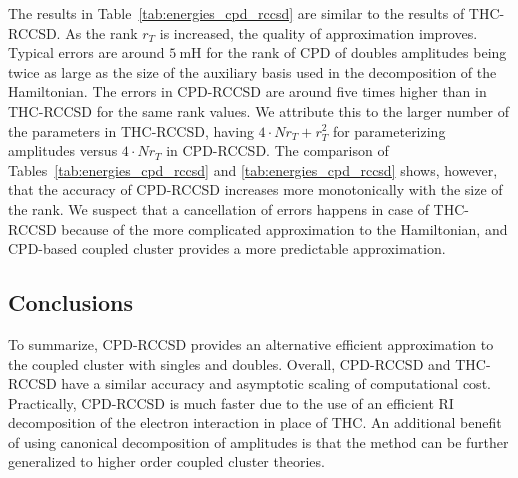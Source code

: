 %
The results in Table~\ref{tab:energies_cpd_rccsd} are similar to the results
of THC-RCCSD. As the rank $r_{T}$ is increased, the quality of approximation 
improves. Typical errors are around $5~\mathrm{mH}$ for the rank of CPD of 
doubles amplitudes being twice as large as the size of the auxiliary basis used 
in the decomposition of the Hamiltonian. The errors in CPD-RCCSD are around five 
times higher than in THC-RCCSD for the same rank values. We attribute this to 
the larger number of the parameters in THC-RCCSD, having $4 \cdot N r_{T} + 
r^{2}_{T}$ for parameterizing amplitudes versus $4 \cdot N r_{T}$ in CPD-RCCSD. 
The comparison of Tables~\ref{tab:energies_cpd_rccsd} and 
\ref{tab:energies_cpd_rccsd} shows, however, that the accuracy of CPD-RCCSD 
increases more monotonically with the size of the rank. We suspect that a 
cancellation of errors happens in case of THC-RCCSD because of the more 
complicated approximation to the Hamiltonian, and CPD-based coupled 
cluster provides a more predictable approximation.

\subsection{Conclusions}
To summarize, CPD-RCCSD provides an alternative efficient approximation to the 
coupled cluster with singles and doubles. Overall, CPD-RCCSD and THC-RCCSD 
have a similar accuracy and asymptotic scaling of computational cost. 
Practically, CPD-RCCSD is much faster due to the use of an efficient RI 
decomposition of the electron interaction in place of THC. An additional 
benefit of using canonical decomposition of amplitudes is that the method can 
be further generalized to higher order coupled cluster theories.


